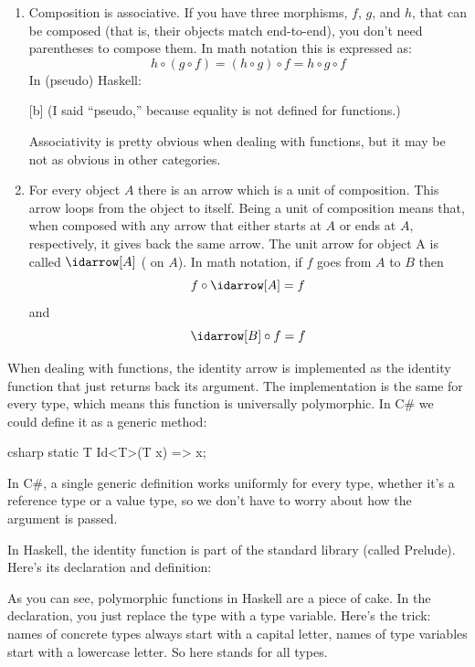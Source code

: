\begin{enumerate}
  \item
        Composition is associative. If you have three morphisms, $f$, $g$, and $h$,
        that can be composed (that is, their objects match end-to-end), you
        don't need parentheses to compose them. In math notation this is
        expressed as:
        \[h \circ (g \circ f) = (h \circ g) \circ f = h \circ g \circ f\]
        In (pseudo) Haskell:

        [b]
        (I said ``pseudo,'' because equality is not defined for functions.)

        Associativity is pretty obvious when dealing with functions, but it may
        be not as obvious in other categories.

  \item
        For every object $A$ there is an arrow which is a unit of composition.
        This arrow loops from the object to itself. Being a unit of composition
        means that, when composed with any arrow that either starts at $A$ or ends
        at $A$, respectively, it gives back the same arrow. The unit arrow for
        object A is called $\idarrow[A]$ ( on $A$). In math
        notation, if $f$ goes from $A$ to $B$ then
        \[f \circ \idarrow[A] = f\]
        and
        \[\idarrow[B] \circ f = f\]
\end{enumerate}
When dealing with functions, the identity arrow is implemented as the
identity function that just returns back its argument. The
implementation is the same for every type, which means this function is
universally polymorphic. In C\# we could define it as a generic method:

\begin{snip}{csharp}
static T Id<T>(T x) => x;
\end{snip}
In C\#, a single generic definition works uniformly for every type,
whether it's a reference type or a value type, so we don't have to
worry about how the argument is passed.

In Haskell, the identity function is part of the standard library
(called Prelude). Here's its declaration and definition:

As you can see, polymorphic functions in Haskell are a piece of cake. In
the declaration, you just replace the type with a type variable. Here's
the trick: names of concrete types always start with a capital letter,
names of type variables start with a lowercase letter. So here
 stands for all types.

